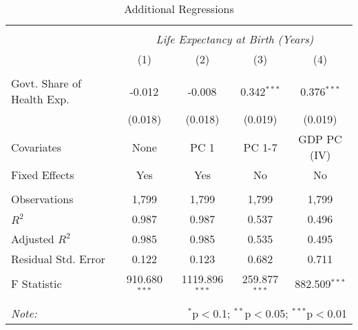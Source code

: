 \begin{table}[!htbp] \centering
  \caption{Additional Regressions \label{additional_regs}}
\begin{tabular}{@{\extracolsep{5pt}}lcccc}
\\[-1.8ex]\hline
\hline \\[-1.8ex]
& \multicolumn{4}{c}{\textit{Life Expectancy at Birth (Years)}} \
\cr \
\\[-1.8ex] & (1) & (2) & (3) & (4) \\
\hline \\[-1.8ex]
 Govt. Share of Health Exp. & -0.012$^{}$ & -0.008$^{}$ & 0.342$^{***}$ & 0.376$^{***}$ \\
  & (0.018) & (0.018) & (0.019) & (0.019) \\
 Covariates & None & PC 1 & PC 1-7 & GDP PC (IV) \\
 Fixed Effects & Yes & Yes & No & No \\
\hline \\[-1.8ex]
 Observations & 1,799 & 1,799 & 1,799 & 1,799 \\
 $R^2$ & 0.987 & 0.987 & 0.537 & 0.496 \\
 Adjusted $R^2$ & 0.985 & 0.985 & 0.535 & 0.495 \\
 Residual Std. Error & 0.122 & 0.123 & 0.682 & 0.711  \\
 F Statistic & 910.680$^{***}$  & 1119.896$^{***}$  & 259.877$^{***}$  & 882.509$^{***}$  \\
\hline
\hline \\[-1.8ex]
\textit{Note:} & \multicolumn{4}{r}{$^{*}$p$<$0.1; $^{**}$p$<$0.05; $^{***}$p$<$0.01} \\
\end{tabular}
\end{table}